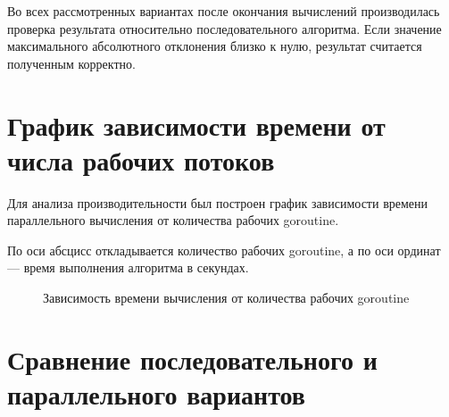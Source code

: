 \documentclass[a4paper, 14pt]{extarticle}
\begin{document}
Во всех рассмотренных вариантах после окончания вычислений
производилась проверка результата относительно
последовательного алгоритма. Если значение максимального
абсолютного отклонения близко к нулю, результат считается
полученным корректно.



\section{График зависимости времени от числа рабочих потоков}

Для анализа производительности был построен график зависимости
времени параллельного вычисления от количества рабочих goroutine.

По оси абсцисс откладывается количество рабочих goroutine,
а по оси ординат --- время выполнения алгоритма в секундах.

\begin{figure}[H]

\centering


\caption{Зависимость времени вычисления от количества рабочих goroutine}

\end{figure}



\section{Сравнение последовательного и параллельного вариантов}
\end{document}

